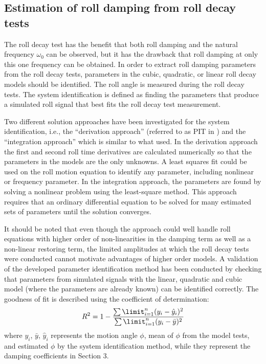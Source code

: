 \subsection{Estimation of roll damping from roll decay tests}
\label{se:experimental_estimation}
The roll decay test has the benefit that both roll damping and the natural frequency $\omega_0$ can be observed, but it has the drawback that roll damping at only this one frequency can be obtained. In order to extract roll damping parameters from the roll decay tests, parameters in the cubic, quadratic, or linear roll decay models should be identified. The roll angle is measured during the roll decay tests. The system identification is defined as finding the parameters that produce a simulated roll signal that best fits the roll decay test measurement. 

Two different solution approaches have been investigated for the system identification, i.e., the ``derivation approach'' (referred to as PIT in \parencite{imo_1200_2006}) and the ``integration approach'' which is similar to what \parencite{soder_assessment_2019} used. In the derivation approach the first and second roll time derivatives are calculated numerically so that the parameters in the models are the only unknowns. A least squares fit could be used on the roll motion equation to identify any parameter, including nonlinear or frequency parameter. In the integration approach, the parameters are found by solving a nonlinear problem using the least-square method. This approach requires that an ordinary differential equation to be solved for many estimated sets of parameters until the solution converges.

It should be noted that even though the approach could well handle roll equations with higher order of non-linearities in the damping term as well as a non-linear restoring term, the limited amplitudes at which the roll decay tests were conducted cannot motivate advantages of higher order models. A validation of the developed parameter identification method has been conducted by checking that parameters from simulated signals with the linear, quadratic and cubic model  (where the parameters are already known) can be identified correctly. 
The goodness of fit is described using the coefficient of determination:
\begin{equation} \label{eq:R2}
R^2=1-\frac{\sum\limit_{i=1}^{n}(y_i-\hat{y}_i)^2}{\sum\limit_{i=1}^{n}(y_i-\bar{y})^2}
\end{equation}
where $y_i$, $\bar y$, $\hat{y}_i$ represents the motion angle $\phi$, mean of $\phi$ from the model tests, and estimated $\phi$ by the system identification method, while they represent the damping coefficients in  Section 3.      


